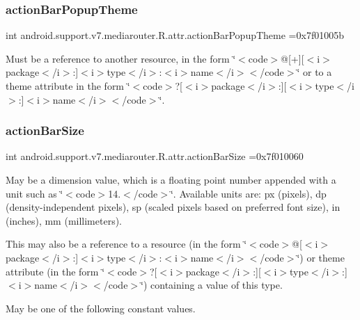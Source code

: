 \subsubsection{\texorpdfstring{action\+Bar\+Popup\+Theme}{actionBarPopupTheme}}
{\footnotesize\ttfamily int android.\+support.\+v7.\+mediarouter.\+R.\+attr.\+action\+Bar\+Popup\+Theme =0x7f01005b\hspace{0.3cm}{\ttfamily [static]}}

Must be a reference to another resource, in the form \char`\"{}$<$code$>$@\mbox{[}+\mbox{]}\mbox{[}$<$i$>$package$<$/i$>$\+:\mbox{]}$<$i$>$type$<$/i$>$\+:$<$i$>$name$<$/i$>$$<$/code$>$\char`\"{} or to a theme attribute in the form \char`\"{}$<$code$>$?\mbox{[}$<$i$>$package$<$/i$>$\+:\mbox{]}\mbox{[}$<$i$>$type$<$/i$>$\+:\mbox{]}$<$i$>$name$<$/i$>$$<$/code$>$\char`\"{}. \mbox{\label{classandroid_1_1support_1_1v7_1_1mediarouter_1_1R_1_1attr_a56538f222ace8f340c54208e10527233}} 
\subsubsection{\texorpdfstring{action\+Bar\+Size}{actionBarSize}}
{\footnotesize\ttfamily int android.\+support.\+v7.\+mediarouter.\+R.\+attr.\+action\+Bar\+Size =0x7f010060\hspace{0.3cm}{\ttfamily [static]}}

May be a dimension value, which is a floating point number appended with a unit such as \char`\"{}$<$code$>$14.\+5sp$<$/code$>$\char`\"{}. Available units are\+: px (pixels), dp (density-\/independent pixels), sp (scaled pixels based on preferred font size), in (inches), mm (millimeters). 

This may also be a reference to a resource (in the form \char`\"{}$<$code$>$@\mbox{[}$<$i$>$package$<$/i$>$\+:\mbox{]}$<$i$>$type$<$/i$>$\+:$<$i$>$name$<$/i$>$$<$/code$>$\char`\"{}) or theme attribute (in the form \char`\"{}$<$code$>$?\mbox{[}$<$i$>$package$<$/i$>$\+:\mbox{]}\mbox{[}$<$i$>$type$<$/i$>$\+:\mbox{]}$<$i$>$name$<$/i$>$$<$/code$>$\char`\"{}) containing a value of this type. 

May be one of the following constant values.

